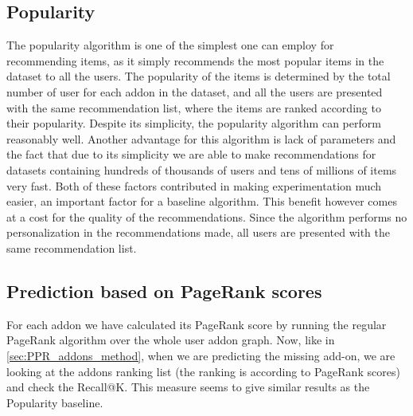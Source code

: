 \documentclass[11pt,oneside]{book}
\let\Oldsubsection\subsection
\renewcommand{\subsection}{\FloatBarrier\Oldsubsection}
\begin{document}
\subsection{Popularity}
The popularity algorithm is one of the simplest one can employ for recommending items, as it simply recommends the most popular items in the dataset to all the users. The popularity of the items is determined by the total number of user for each addon in the dataset, and all the users are presented with the same recommendation list, where the items are ranked according to their popularity. Despite its
simplicity, the popularity algorithm can perform reasonably well.
Another advantage for this algorithm is lack of parameters and the fact that due to its simplicity we are able to make recommendations for datasets containing hundreds of thousands of users and tens of millions of items very fast. Both of these factors contributed in making experimentation much easier, an important factor for a baseline algorithm.
This benefit however comes at a cost for the quality of the recommendations. Since the algorithm performs no personalization in the recommendations made, all users are presented with the same recommendation list.
\subsection{Prediction based on PageRank scores}
For each addon we have calculated its PageRank score by running the regular PageRank algorithm over the whole user addon graph. Now, like in \autoref{sec:PPR_addons_method}, when we are predicting the missing add-on, we are looking at the addons ranking list (the ranking is according to PageRank scores) and check the Recall@K. This measure seems to give similar results as the Popularity baseline.
\end{document}
